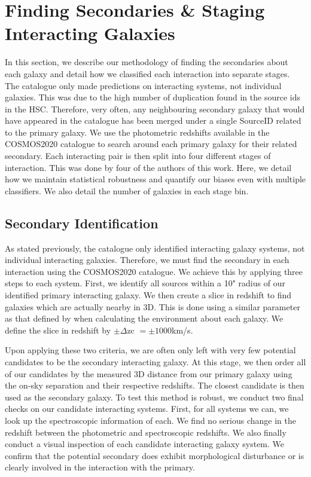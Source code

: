 \documentclass[fleqn,usenatbib]{mnras}
\begin{document}
\section{Finding Secondaries \& Staging Interacting Galaxies}\label{staging}
In this section, we describe our methodology of finding the secondaries about each galaxy and detail how we classified each interaction into separate stages. The \citet{2023ApJ...948...40O} catalogue only made predictions on interacting systems, not individual galaxies. This was due to the high number of duplication found in the source ids in the HSC. Therefore, very often, any neighbouring secondary galaxy that would have appeared in the catalogue has been merged under a single SourceID related to the primary galaxy. We use the photometric redshifts available in the COSMOS2020 catalogue to search around each primary galaxy for their related secondary. Each interacting pair is then split into four different stages of interaction. This was done by four of the authors of this work. Here, we detail how we maintain statistical robustness and quantify our biases even with multiple classifiers. We also detail the number of galaxies in each stage bin.

\subsection{Secondary Identification}
\noindent As stated previously, the \citet{2023ApJ...948...40O} catalogue only identified interacting galaxy systems, not individual interacting galaxies. Therefore, we must find the secondary in each interaction using the COSMOS2020 catalogue. We achieve this by applying three steps to each system. First, we identify all sources within a 10" radius of our identified primary interacting galaxy. We then create a slice in redshift to find galaxies which are actually nearby in 3D. This is done using a similar parameter as that defined by \citet{Baldry et al. (2006)} when calculating the environment about each galaxy. We define the slice in redshift by $\pm\Delta$zc $= \pm1000$km/s.

Upon applying these two criteria, we are often only left with very few potential candidates to be the secondary interacting galaxy. At this stage, we then order all of our candidates by the measured 3D distance from our primary galaxy using the on-sky separation and their respective redshifts. The closest candidate is then used as the secondary galaxy. To test this method is robust, we conduct two final checks on our candidate interacting systems. First, for all systems we can, we look up the spectroscopic information of each. We find no serious change in the redshift between the photometric and spectroscopic redshifts. We also finally conduct a visual inspection of each candidate interacting galaxy system. We confirm that the potential secondary does exhibit morphological disturbance or is clearly involved in the interaction with the primary.
\end{document}
